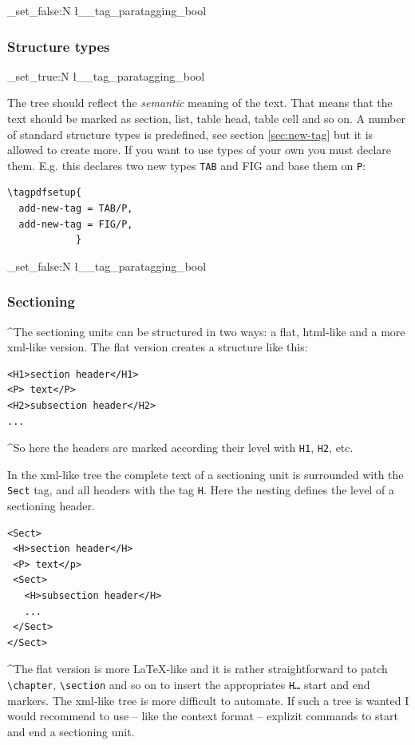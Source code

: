 \documentclass[DIV=12,parskip=half-,bibliography=totoc]{scrartcl}
\newcommand\parataggingON {\bool_set_true:N \l__tag_paratagging_bool}
\newcommand\parataggingOff{\bool_set_false:N \l__tag_paratagging_bool}
\begin{document}
\parataggingOff

\subsubsection{Structure types}

\parataggingON

The tree should reflect the \emph{semantic} meaning of the text. That means that the text should be marked as section, list, table head, table cell and so on. A number of standard structure types is predefined, see section \ref{sec:new-tag} but it is allowed to create more. If you want to use types of your own you must declare them. E.g. this declares two new types \texttt{TAB} and {FIG} and base them on \texttt{P}:


\begin{lstlisting}
\tagpdfsetup{
  add-new-tag = TAB/P,
  add-new-tag = FIG/P,
            }
\end{lstlisting}

\parataggingOff

\subsubsection{Sectioning}
\TagP^The sectioning units can be structured in two ways: a flat, html-like and a more xml-like version.
The flat version creates a structure like this:\TagPend


\begin{lstlisting}
<H1>section header</H1>
<P> text</P>
<H2>subsection header</H2>
...
\end{lstlisting}


\TagP^So here the headers are marked according their level with \texttt{H1}, \texttt{H2}, etc.

\TagP In the xml-like tree the complete text of a sectioning unit is surrounded with the \texttt{Sect} tag, and all headers with the tag \texttt{H}. Here the nesting defines the level of a sectioning header.\TagPend


\begin{lstlisting}
<Sect>
 <H>section header</H>
 <P> text</p>
 <Sect>
   <H>subsection header</H>
   ...
 </Sect>
</Sect>
\end{lstlisting}


\TagP^The flat version is more \LaTeX-like and it is rather straightforward to patch \verb+\chapter+, \verb+\section+ and so on to insert the appropriates \texttt{H\ldots} start and end markers. The xml-like tree is more difficult to automate. If such a tree is wanted I would recommend to use -- like the context format -- explizit commands to start and end a sectioning unit.
\TagPend
\end{document}

